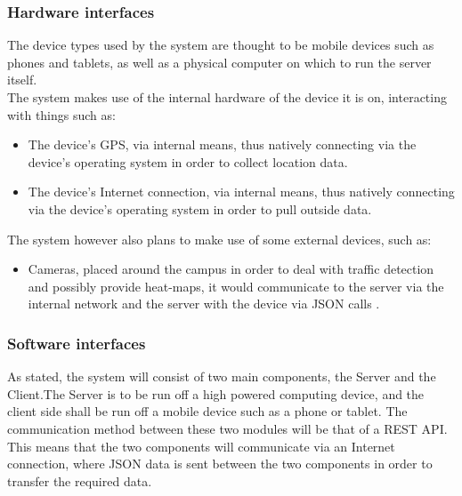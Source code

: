 \documentclass{article}
\begin{document}
			\pagebreak
			
			\subsubsection{Hardware interfaces}
			
			The device types used by the system are thought to be mobile devices such as phones and tablets, as well as a physical computer on which to run the server itself.\\
			
			The system makes use of the internal hardware of the device it is on, interacting with things such as:
			
				\begin{itemize}
					\item The device's GPS, via internal means, thus natively connecting via the device's operating system in order to collect location data.
					\item The device's Internet connection, via internal means, thus natively connecting via the device's operating system in order to pull outside data.
				\end{itemize}
			
			The system however also plans to make use of some external devices, such as:
			
				\begin{itemize}
					\item Cameras, placed around the campus in order to deal with traffic detection and possibly provide heat-maps, it would communicate to the server via the internal network and the server with the device via JSON calls .
				\end{itemize}
			
			\subsubsection{Software interfaces}
			
			As stated, the system will consist of two main components, the Server and the Client.The Server is to be run off a high powered computing device, and the client side shall be run off a mobile device such as a phone or tablet. The communication method between these two modules will be that of a REST API. This means that the two components will communicate via an Internet connection, where JSON data is sent between the two components in order to transfer the required data.\\
			
\end{document}
